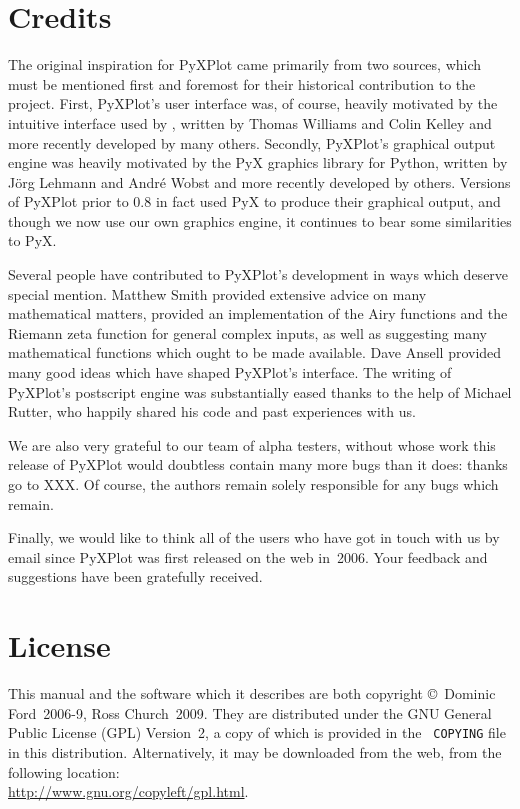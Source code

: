 \section{Credits}

The original inspiration for PyXPlot came primarily from two sources, which
must be mentioned first and foremost for their historical contribution to the
project. First, PyXPlot's user interface was, of course, heavily motivated by
the intuitive interface used by \gnuplot, written by Thomas Williams and Colin
Kelley and more recently developed by many others. Secondly, PyXPlot's
graphical output engine was heavily motivated by the PyX graphics
library for Python, written by J\"org Lehmann and Andr\'e Wobst and more
recently developed by others. Versions of PyXPlot prior to 0.8 in fact used PyX
to produce their graphical output, and though we now use our own graphics
engine, it continues to bear some similarities to PyX.

Several people have contributed to PyXPlot's development in ways which deserve
special mention.  Matthew Smith provided extensive advice on many mathematical
matters, provided an implementation of the Airy functions and the Riemann zeta
function for general complex inputs, as well as suggesting many mathematical
functions which ought to be made available. Dave Ansell provided many good
ideas which have shaped PyXPlot's interface. The writing of PyXPlot's
postscript engine was substantially eased thanks to the help of Michael Rutter,
who happily shared his code and past experiences with us.

We are also very grateful to our team of alpha testers, without whose work this
release of PyXPlot would doubtless contain many more bugs than it does: thanks
go to XXX. Of course, the authors remain solely responsible for any bugs which
remain.

Finally, we would like to think all of the users who have got in touch with us
by email since PyXPlot was first released on the web in~2006. Your feedback and
suggestions have been gratefully received.

\section{License}

This manual and the software which it describes are both copyright \copyright\
Dominic Ford~2006-9, Ross Church~2009. They are distributed under the GNU
General Public License (GPL) Version~2, a copy of which is provided in the {\tt
COPYING} file in this distribution. Alternatively, it may be downloaded from the web, from
the following location:\\ \url{http://www.gnu.org/copyleft/gpl.html}.

